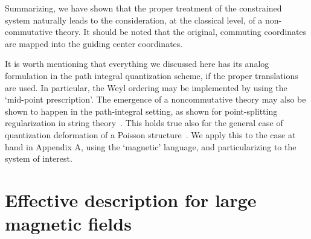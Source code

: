\documentclass[a4paper,12pt]{article}
\begin{document}
Summarizing, we have shown that the proper treatment of the
constrained system naturally leads to the consideration, at the
classical level, of a non-commutative theory.  It should be noted
that
the original, commuting coordinates are mapped into the guiding
center
coordinates.

It is worth mentioning that everything we discussed here has its
analog formulation in the path integral quantization scheme, if the
proper translations are used. In particular, the Weyl ordering may
be
implemented by using the `mid-point prescription'.  The emergence
of a
noncommutative theory may also be shown to happen in the
path-integral
setting, as shown for point-splitting regularization in string
theory~\cite{SW}. This holds true also for the general case of
quantization deformation of a Poisson structure~\cite{cattaneo}. We
apply this to the case at hand in Appendix A, using the `magnetic'
language, and particularizing to the system of interest.


\section{Effective description for large magnetic fields}
\label{sec:eff}
 
\end{document}
